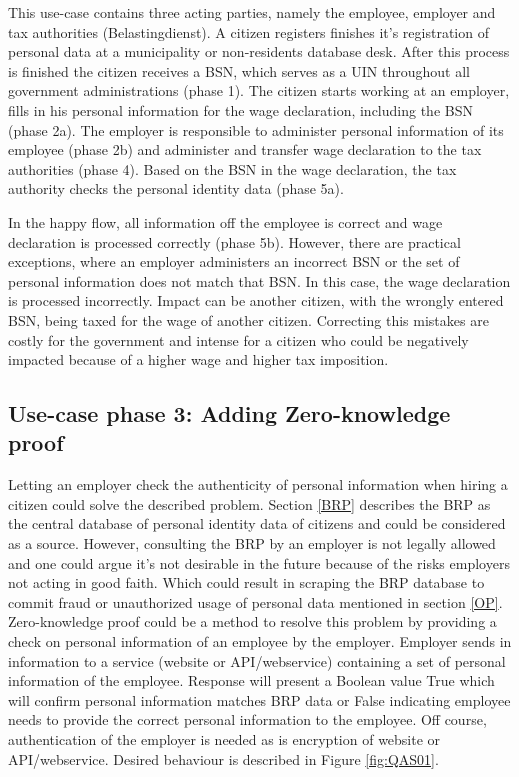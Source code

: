 This use-case contains three acting parties, namely the employee, employer and tax authorities (Belastingdienst).
A citizen registers finishes it's registration of personal data at a municipality or non-residents database desk. After this process is finished the citizen receives a BSN, which serves as a UIN throughout all government administrations (phase 1). The citizen starts working at an employer, fills in his personal information for the wage declaration, including the BSN (phase 2a). The employer is responsible to administer personal information of its employee (phase 2b) and administer and transfer wage declaration to the tax authorities (phase 4). Based on the BSN in the wage declaration, the tax authority checks the personal identity data (phase 5a). \par
In the happy flow, all information off the employee is correct and wage declaration is processed correctly (phase 5b). However, there are practical exceptions, where an employer administers an incorrect BSN or the set of personal information does not match that BSN. In this case, the wage declaration is processed incorrectly. Impact can be another citizen, with the wrongly entered BSN, being taxed for the wage of another citizen. Correcting this mistakes are costly for the government and intense for a citizen who could be negatively impacted because of a higher wage and higher tax imposition.

\subsection{Use-case phase 3: Adding Zero-knowledge proof}
Letting an employer check the authenticity of personal information when hiring a citizen could solve the described problem. Section \ref{BRP} describes the BRP as the central database of personal identity data of citizens and could be considered as a source. However, consulting the BRP by an employer is not legally allowed and one could argue it's not desirable in the future because of the risks employers not acting in good faith. Which could result in scraping the BRP database to commit fraud or unauthorized usage of personal data mentioned in section \ref{OP}. Zero-knowledge proof could be a method to resolve this problem by providing a check on personal information of an employee by the employer. Employer sends in information to a service (website or API/webservice) containing a set of personal information of the employee. Response will present a Boolean value True which will confirm personal information matches BRP data or False indicating employee needs to provide the correct personal information to the employee. Off course, authentication of the employer is needed as is encryption of website or API/webservice. Desired behaviour is described in Figure \ref{fig:QAS01}.

